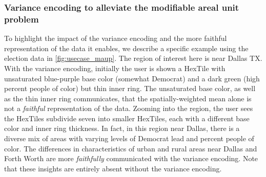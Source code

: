 \subsubsection{Variance encoding to alleviate the modifiable areal unit problem}
To highlight the impact of the variance encoding and the more faithful representation of the data it enables, we describe a specific example using the election data in \cref{fig:usecase_maup}.
%
The region of interest here is near Dallas TX. 
%
With the variance encoding, initially the user is shown a HexTile with unsaturated blue-purple base color (somewhat Democrat) and a dark green (high percent people of color) but thin inner ring.
%
The unsaturated base color, as well as the thin inner ring communicates, that the spatially-weighted mean alone is not a \textit{faithful} representation of the data.
%
Zooming into the region, the user sees the HexTiles subdivide seven into smaller HexTiles, each with a different base color and inner ring thickness.
%
In fact, in this region near Dallas, there is a diverse mix of areas with varying levels of Democrat lead and percent people of color.
%
The differences in characteristics of urban and rural areas near Dallas and Forth Worth are more \textit{faithfully} communicated with the variance encoding.
%
Note that these insights are entirely absent without the variance encoding.
%

